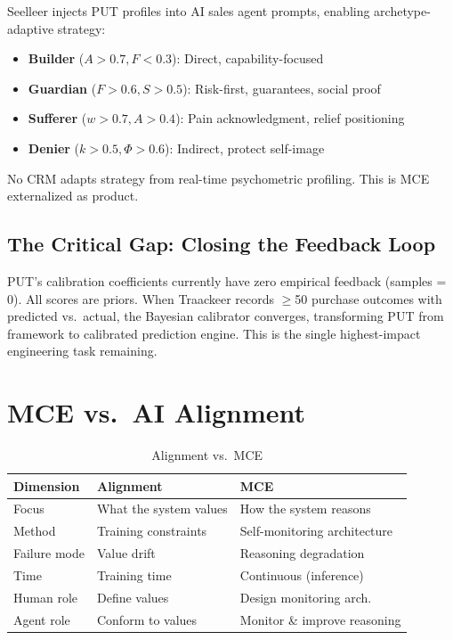 \documentclass[12pt,a4paper]{article}
\theoremstyle{plain}
\theoremstyle{definition}
\theoremstyle{remark}
\begin{document}
Seelleer injects PUT profiles into AI sales agent prompts, enabling archetype-adaptive strategy:

\begin{itemize}[nosep]
\item \textbf{Builder} ($A{>}0.7, F{<}0.3$): Direct, capability-focused
\item \textbf{Guardian} ($F{>}0.6, S{>}0.5$): Risk-first, guarantees, social proof
\item \textbf{Sufferer} ($w{>}0.7, A{>}0.4$): Pain acknowledgment, relief positioning
\item \textbf{Denier} ($k{>}0.5, \Phi{>}0.6$): Indirect, protect self-image
\end{itemize}

No CRM adapts strategy from real-time psychometric profiling. This is MCE externalized as product.

\subsection{The Critical Gap: Closing the Feedback Loop}

PUT's calibration coefficients currently have zero empirical feedback (samples = 0). All scores are priors. When Traackeer records $\geq$50 purchase outcomes with predicted vs.\ actual, the Bayesian calibrator converges, transforming PUT from framework to calibrated prediction engine. This is the single highest-impact engineering task remaining.

\section{MCE vs.\ AI Alignment}
\label{sec:alignment}

\begin{table}[H]
\centering
\caption{Alignment vs.\ MCE}
\begin{tabular}{@{}lll@{}}
\toprule
\textbf{Dimension} & \textbf{Alignment} & \textbf{MCE} \\
\midrule
Focus & What the system values & How the system reasons \\
Method & Training constraints & Self-monitoring architecture \\
Failure mode & Value drift & Reasoning degradation \\
Time & Training time & Continuous (inference) \\
Human role & Define values & Design monitoring arch. \\
Agent role & Conform to values & Monitor \& improve reasoning \\
\bottomrule
\end{tabular}
\end{table}
\end{document}
